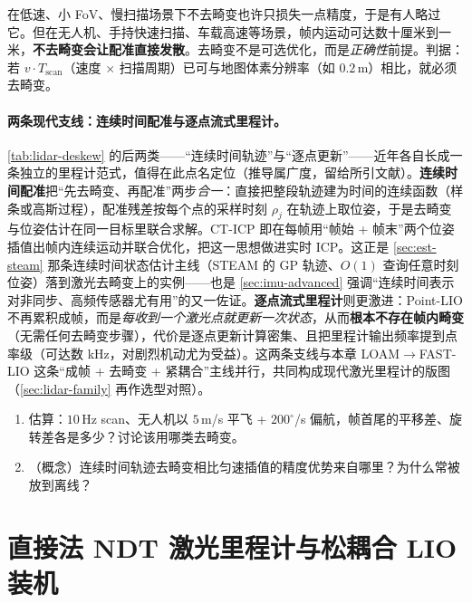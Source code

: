 \begin{pitfall}
在低速、小 FoV、慢扫描场景下不去畸变也许只损失一点精度，于是有人略过它。但在无人机、手持快速扫描、车载高速等场景，帧内运动可达数十厘米到一米，\textbf{不去畸变会让配准直接发散}。去畸变不是可选优化，而是\emph{正确性}前提。判据：若 $v\cdot T_{\text{scan}}$（速度 $\times$ 扫描周期）已可与地图体素分辨率（如 $0.2$\,m）相比，就必须去畸变。
\end{pitfall}

\paragraph{两条现代支线：连续时间配准与逐点流式里程计。}\label{par:lidar-ct-pointwise}
\cref{tab:lidar-deskew} 的后两类——“连续时间轨迹”与“逐点更新”——近年各自长成一条独立的里程计范式，值得在此点名定位（推导属广度，留给所引文献）。\textbf{连续时间配准}把“先去畸变、再配准”两步\emph{合一}：直接把整段轨迹建为时间的连续函数（样条或高斯过程），配准残差按每个点的采样时刻 $\rho_j$ 在轨迹上取位姿，于是去畸变与位姿估计在同一目标里联合求解。CT-ICP\cite{dellenbach2022cticp} 即在每帧用“帧始 + 帧末”两个位姿插值出帧内连续运动并联合优化，把这一思想做进实时 ICP。这正是 \cref{sec:est-steam} 那条连续时间状态估计主线（STEAM 的 GP 轨迹、$O(1)$ 查询任意时刻位姿）落到激光去畸变上的实例——也是 \cref{sec:imu-advanced} 强调“连续时间表示对非同步、高频传感器尤有用”的又一佐证。\textbf{逐点流式里程计}则更激进：Point-LIO\cite{he2023pointlio} 不再累积成帧，而是\emph{每收到一个激光点就更新一次状态}，从而\textbf{根本不存在帧内畸变}（无需任何去畸变步骤），代价是逐点更新计算密集、且把里程计输出频率提到点率级（可达数 kHz，对剧烈机动尤为受益）。这两条支线与本章 LOAM$\to$FAST-LIO 这条“成帧 + 去畸变 + 紧耦合”主线并行，共同构成现代激光里程计的版图（\cref{sec:lidar-family} 再作选型对照）。

\begin{practice}
\begin{enumerate}
  \item 估算：$10$\,Hz scan、无人机以 $5$\,m/s 平飞 + $200^\circ$/s 偏航，帧首尾的平移差、旋转差各是多少？讨论该用哪类去畸变。
  \item （概念）连续时间轨迹去畸变相比匀速插值的精度优势来自哪里？为什么常被放到离线？
\end{enumerate}
\end{practice}

\section{直接法 NDT 激光里程计与松耦合 LIO 装机}
\label{sec:lidar-direct-lio}

